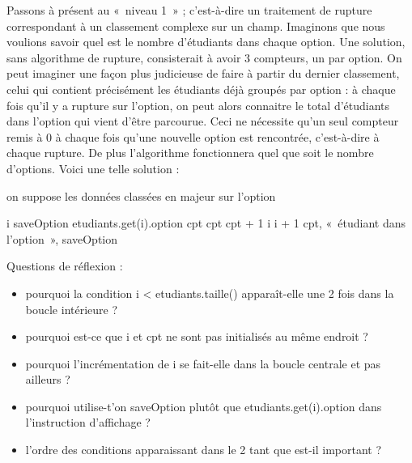 	Passons à présent au «~niveau 1~» ; c’est-à-dire un traitement de
	rupture correspondant à un classement complexe sur un champ. 
	Imaginons que nous voulions savoir quel est le nombre d’étudiants dans chaque option. 
	Une solution, sans algorithme de rupture, consisterait à avoir 3 compteurs, un par option.
	On peut imaginer une façon plus judicieuse de faire à partir du dernier classement, celui
	qui contient précisément les étudiants déjà groupés par option : 
	à chaque fois qu’il y a rupture sur l’option, 
	on peut alors connaitre le total d’étudiants dans l’option qui vient d’être parcourue. 
	Ceci ne nécessite qu’un seul compteur remis à 0 à chaque fois qu’une nouvelle
	option est rencontrée, c’est-à-dire à chaque rupture. 
	De plus l’algorithme fonctionnera quel que soit le nombre d’options. 
	Voici une telle solution : 

	\begin{LDA}
		\label{algo:rupt1}
			\LComment on suppose les données classées en majeur sur l’option
	
			\Let i 
				\Let saveOption \Gets etudiants.get(i).option
				\Let cpt 
					\Let cpt \Gets cpt + 1
					\Let i \Gets i + 1
				\EndWhile
				\Write cpt, «~étudiant dans l’option~», saveOption
			\EndWhile
		\EndAlgo
	\end{LDA}

	\medskip
	Questions de réflexion :
	\begin{itemize}
		\item 
			pourquoi la condition \textsf{i < etudiants.taille()}
			apparaît-elle une 2\ieme{} fois dans la boucle intérieure ?
		\item 
			pourquoi est-ce que \textsf{i} et \textsf{cpt} 
			ne sont pas initialisés au même endroit ?
		\item 
			pourquoi l'incrémentation de \textsf{i} se fait-elle dans la boucle centrale 
			et pas ailleurs ?
		\item 
			pourquoi utilise-t'on 
			\textsf{saveOption} plutôt que \textsf{etudiants.get(i).option}
			dans l’instruction d’affichage ?
		\item 
			l’ordre des conditions apparaissant dans le 2\ieme{} \og{}tant que\fg{} 
			est-il important ?
	\end{itemize}

